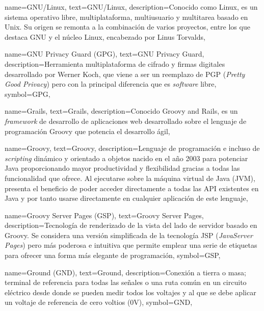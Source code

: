 {
    name={GNU/Linux},
    text={GNU/Linux},
    description={Conocido como Linux, es un sistema operativo libre, multiplataforma, multiusuario y multitarea basado en Unix. Su origen se remonta a la combinación de varios proyectos, entre los que destaca GNU y el núcleo Linux, encabezado por Linus Torvalds},
}

{
    name={GNU Privacy Guard (GPG)},
    text={GNU Privacy Guard},
    description={Herramienta multiplataforma de cifrado y firmas digitales desarrollado por Werner Koch, que viene a ser un reemplazo de PGP (\textit{Pretty Good Privacy}) pero con la principal diferencia que es \textit{software} libre},
    symbol={GPG},
}

{
    name={Grails},
    text={Grails},
    description={Conocido Groovy and Rails, es un \textit{framework} de desarrollo de aplicaciones web desarrollado sobre el lenguaje de programación Groovy que potencia el desarrollo ágil},
}

{
    name={Groovy},
    text={Groovy},
    description={Lenguaje de programación e incluso de \textit{scripting} dinámico y orientado a objetos nacido en el año 2003 para potenciar Java proporcionando mayor productividad y flexibilidad gracias a todas las funcionalidad que ofrece. Al ejecutarse sobre la máquina virtual de Java (JVM), presenta el beneficio de poder acceder directamente a todas las API existentes en Java y por tanto usarse directamente en cualquier aplicación de este lenguaje},
}

{
    name={Groovy Server Pages (GSP)},
    text={Groovy Server Pages},
    description={Tecnología de renderizado de la vista del lado de servidor basado en Groovy. Se considera una versión simplificada de la tecnología JSP (\textit{JavaServer Pages}) pero más poderosa e intuitiva que permite emplear una serie de etiquetas para ofrecer una forma más elegante de programación},
    symbol={GSP},
}

{
    name={Ground (GND)},
    text={Ground},
    description={Conexión a tierra o masa; terminal de referencia para todas las señales o una ruta común en un circuito eléctrico desde donde se pueden medir todos los voltajes y al que se debe aplicar un voltaje de referencia de cero voltios (0V)},
    symbol={GND},
}

